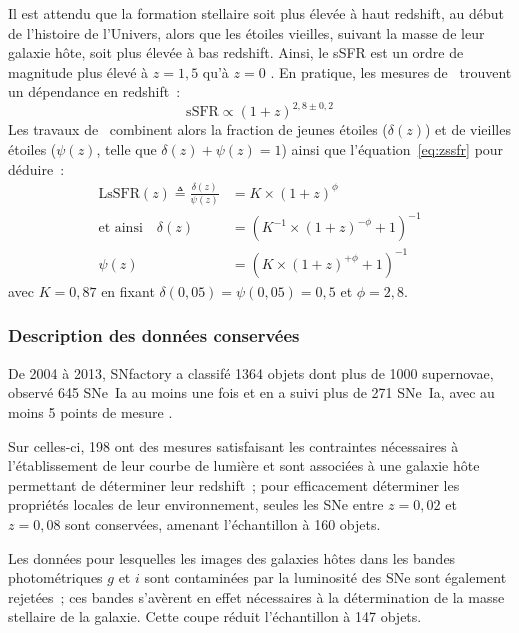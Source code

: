 \documentclass[../main/main.tex]{subfiles}
\begin{document}
Il est attendu que la formation stellaire soit plus élevée à haut redshift, au
début de l'histoire de l'Univers, alors que les étoiles vieilles, suivant la
masse de leur galaxie hôte, soit plus élevée à bas redshift. Ainsi, le sSFR est
un ordre de magnitude plus élevé à $z = 1,5$ qu'à $z = 0$ \citep[voir][pour une
étude complète]{madau2015}. En pratique, les mesures de~\cite{tasca2015}
trouvent un dépendance en redshift~:
\begin{equation}\label{eq:zssfr}
    \mathrm{sSFR} \propto (1+z)^{2,8 \pm 0,2}
\end{equation}
Les travaux de~\cite{rigault2020} combinent alors la fraction de jeunes étoiles
($\delta(z)$) et de vieilles étoiles ($\psi(z)$, telle que $\delta(z) + \psi(z)
= 1$) ainsi que l'équation~\ref{eq:zssfr} pour déduire~:
\begin{align}\label{eq:dpz}
    \mathrm{LsSFR}(z) \triangleq \frac{\delta(z)}{\psi(z)} &=
        K\times(1+z)^{\phi} \\\label{eq:deltaz}
    \text{et ainsi}\quad
    \delta(z) & = \left( K^{-1}\times(1+z)^{-\phi} +1 \right)^{-1}
    \\\label{eq:psiz}
    \psi(z)   & = \left( K\times(1+z)^{+\phi} +1 \right)^{-1}
\end{align}
avec $K=0,87$ en fixant $\delta(0,05) = \psi(0,05) = 0,5$ et $\phi = 2,8$.

\subsubsection{Description des données conservées}\label{sssec:snfdata}

De 2004 à 2013, SNfactory a classifé 1364 objets dont plus de 1000 supernovae,
observé 645 SNe~Ia au moins une fois et en a suivi plus de 271 SNe~Ia, avec au
moins 5 points de mesure \citep{copin2013}.

Sur celles-ci, 198 ont des mesures satisfaisant les contraintes nécessaires à
l'établissement de leur courbe de lumière et sont associées à une galaxie hôte
permettant de déterminer leur redshift~; pour efficacement déterminer les
propriétés locales de leur environnement, seules les SNe entre $z = 0,02$ et $z
= 0,08$ sont conservées, amenant l'échantillon à 160 objets.

Les données pour lesquelles les images des galaxies hôtes dans les bandes
photométriques $g$ et $i$ sont contaminées par la luminosité des SNe sont
également rejetées~; ces bandes s'avèrent en effet nécessaires à la
détermination de la masse stellaire de la galaxie. Cette coupe réduit
l'échantillon à 147 objets.
\end{document}
